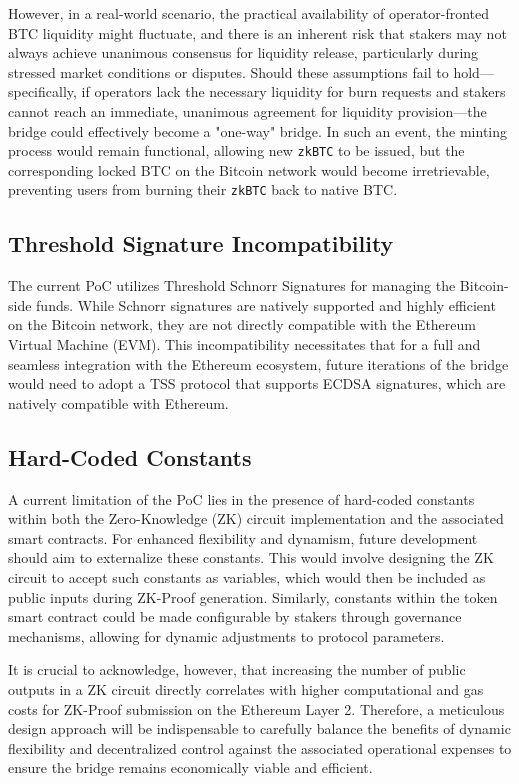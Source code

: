 \documentclass{DESSThesis}
\newcommand{\zktoken}{\texttt{zkBTC}}
\begin{document}
However, in a real-world scenario, the practical availability of operator-fronted BTC liquidity might fluctuate, and there is an inherent risk that stakers may not always achieve unanimous consensus for liquidity release, particularly during stressed market conditions or disputes. Should these assumptions fail to hold—specifically, if operators lack the necessary liquidity for burn requests and stakers cannot reach an immediate, unanimous agreement for liquidity provision—the bridge could effectively become a "one-way" bridge. In such an event, the minting process would remain functional, allowing new \texttt{\zktoken} to be issued, but the corresponding locked BTC on the Bitcoin network would become irretrievable, preventing users from burning their \texttt{\zktoken} back to native BTC.

\subsection{Threshold Signature Incompatibility} \label{subsec:tss_incompatibility}
The current PoC utilizes Threshold Schnorr Signatures for managing the Bitcoin-side funds. While Schnorr signatures are natively supported and highly efficient on the Bitcoin network, they are not directly compatible with the Ethereum Virtual Machine (EVM). This incompatibility necessitates that for a full and seamless integration with the Ethereum ecosystem, future iterations of the bridge would need to adopt a TSS protocol that supports ECDSA signatures, which are natively compatible with Ethereum.

\subsection{Hard-Coded Constants} \label{subsec:hardcoded_constants}
A current limitation of the PoC lies in the presence of hard-coded constants within both the Zero-Knowledge (ZK) circuit implementation and the associated smart contracts. For enhanced flexibility and dynamism, future development should aim to externalize these constants. This would involve designing the ZK circuit to accept such constants as variables, which would then be included as public inputs during ZK-Proof generation. Similarly, constants within the token smart contract could be made configurable by stakers through governance mechanisms, allowing for dynamic adjustments to protocol parameters.

It is crucial to acknowledge, however, that increasing the number of public outputs in a ZK circuit directly correlates with higher computational and gas costs for ZK-Proof submission on the Ethereum Layer 2. Therefore, a meticulous design approach will be indispensable to carefully balance the benefits of dynamic flexibility and decentralized control against the associated operational expenses to ensure the bridge remains economically viable and efficient.
\end{document}
